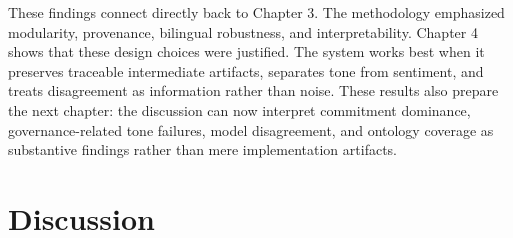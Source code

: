 \documentclass[english, online, cse, master]{dithesis}
\begin{document}
These findings connect directly back to Chapter 3. The methodology emphasized modularity, provenance, bilingual robustness, and interpretability. Chapter 4 shows that these design choices were justified. The system works best when it preserves traceable intermediate artifacts, separates tone from sentiment, and treats disagreement as information rather than noise. These results also prepare the next chapter: the discussion can now interpret commitment dominance, governance-related tone failures, model disagreement, and ontology coverage as substantive findings rather than mere implementation artifacts.






























































 
\chapter{Discussion}
  \label{discussion}
  
\end{document}
